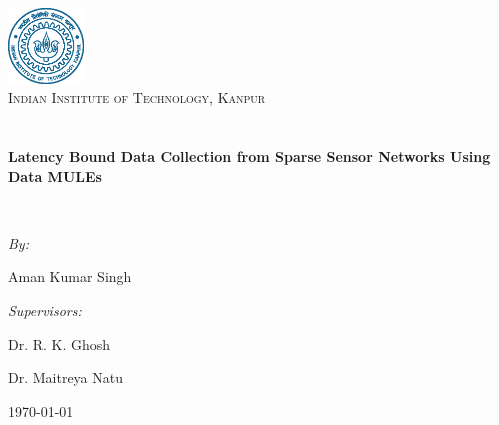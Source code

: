\begin{titlepage}
\begin{center}

\includegraphics[width=0.15\textwidth]{./logo}~\\[1cm]

\textsc{\LARGE Indian Institute of Technology, Kanpur}\\[1.5cm]

\textsc{\Large }\\[0.5cm]

\HRule \\[0.4cm]
{ \huge \bfseries Latency Bound Data Collection from Sparse Sensor Networks Using Data MULEs \\[0.4cm] }

\HRule \\[1.5cm]

\begin{minipage}{0.4\textwidth}
\begin{flushleft} \large
\emph{By:}

Aman Kumar Singh
\end{flushleft}
\end{minipage}
\begin{minipage}{0.4\textwidth}
\begin{flushright} \large
\emph{Supervisors:}

Dr. R. K. Ghosh

Dr. Maitreya Natu
\end{flushright}
\end{minipage}

\vfill

{\large \today}

\end{center}
\end{titlepage}
